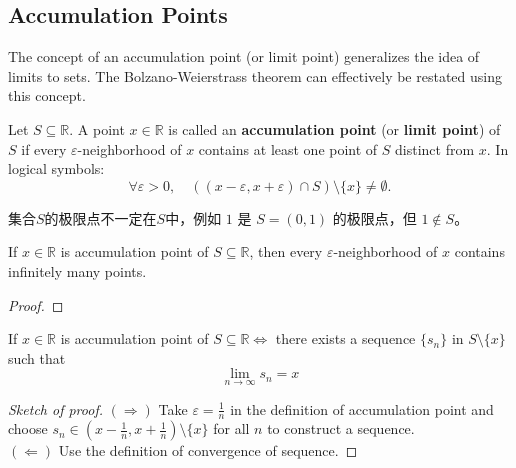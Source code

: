 \documentclass[
	UTF-8,
	11pt, %
	a4paper, %
]{LegrandOrangeBook}
\begin{document}
    \newpage

    \subsection{Accumulation Points}

    The concept of an accumulation point (or limit point) generalizes the idea of limits to sets. The Bolzano-Weierstrass theorem can effectively be restated using this concept.

    \begin{definition}
    Let $S \subseteq \mathbb{R}$. A point $x \in \mathbb{R}$ is 
    called an \textbf{accumulation point} (or \textbf{limit point}) of $S$ 
    if every $\varepsilon$-neighborhood of $x$ contains at least one point of $S$ distinct from $x$.
    In logical symbols:
    \[ \forall \varepsilon > 0, \quad \left( (x - \varepsilon, x + \varepsilon) \cap S \right) \setminus \{x\} \neq \emptyset. \]
    \end{definition}

    \begin{remark}
        集合$S$的极限点不一定在$S$中，例如 $1$ 是 $S = (0,1)$ 的极限点，但 $1 \notin S$。
    \end{remark}

    \begin{theorem}
        If $x \in  \mathbb{R}$ is accumulation point of $S \subseteq \mathbb{R}$, then every
        $\varepsilon$-neighborhood of $x$ contains infinitely many points.
    \end{theorem}

    \begin{proof}
        
    \end{proof}

    \begin{theorem}
        If $x \in  \mathbb{R}$ is accumulation point of $S \subseteq \mathbb{R} \iff$ 
        there exists a sequence $\{s_n\}$ in $S \setminus \{x\}$ such that $$\lim_{n \to \infty} s_n = x$$
    \end{theorem}

    \begin{proof}[Sketch of proof]
        $(\Rightarrow)$ Take $\varepsilon = \frac{1}{n}$ in the definition of accumulation point 
        and choose $s_n \in (x-\frac{1}{n}, x+\frac{1}{n})\setminus \{x\}$ 
        for all $n$ to construct a sequence.\\

        $(\Leftarrow)$ Use the definition of convergence of sequence. 
    \end{proof}
\end{document}
